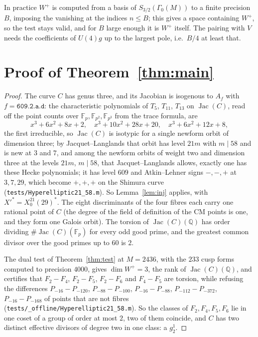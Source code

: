\documentclass[11pt,reqno]{amsart}
\theoremstyle{plain}
\theoremstyle{definition}
\DeclareMathOperator{\Jac}{Jac}
\newcommand{\Q}{\mathbb{Q}}
\newcommand{\F}{\mathbb{F}}
\begin{document}
In practice $W^+$ is computed from a basis of $S_{3/2}(\Gamma_0(M))$ to a finite precision $B$,
imposing the vanishing at the indices $n\le B$; this gives a space containing $W^+$, so the test
stays valid, and for $B$ large enough it is $W^+$ itself. The pairing with $V$ needs the
coefficients of $U(4)g$ up to the largest pole, i.e.\ $B/4$ at least that.

\section{Proof of Theorem~\ref{thm:main}}

\begin{proof}
The curve $C$ has genus three, and its Jacobian is isogenous to $A_f$ with $f=\texttt{609.2.a.d}$:
the characteristic polynomials of $T_5$, $T_{11}$, $T_{13}$ on $\Jac(C)$, read off the point counts
over $\F_p,\F_{p^2},\F_{p^3}$ from the trace formula, are
\[
x^3+6x^2+8x+2,\quad x^3+10x^2+28x+20,\quad x^3+6x^2+12x+8,
\]
the first irreducible, so $\Jac(C)$ is isotypic for a single newform orbit of dimension three; by
Jacquet--Langlands that orbit has level $21m$ with $m\mid58$ and is new at $3$ and $7$, and among the newform orbits of weight two and dimension three at the levels $21m$, $m\mid58$, that
Jacquet--Langlands allows, exactly one has these Hecke polynomials; it has level $609$ and
Atkin--Lehner signs $-,-,+$ at $3,7,29$, which become $+,+,+$ on the Shimura curve
(\texttt{tests/Hyperelliptic21\_58.m}). So Lemma~\ref{lem:inj} applies, with $X'^*=X_0^{21}(29)^*$.
The eight discriminants of the four fibres each carry one rational point of $C$ (the degree of the
field of definition of the CM points is one, and they form one Galois orbit). The torsion of
$\Jac(C)(\Q)$ has order dividing $\#\Jac(C)(\F_p)$ for every odd good prime, and the greatest common
divisor over the good primes up to $60$ is $2$.

The dual test of Theorem~\ref{thm:test} at $M=2436$, with the $233$ cusp forms computed to
precision $4000$, gives $\dim W^+=3$, the rank of $\Jac(C)(\Q)$, and certifies that
$F_2-F_4$, $F_2-F_5$, $F_2-F_6$ and $F_4-F_5$ are torsion, while refusing the differences
$P_{-16}-P_{-120}$, $P_{-88}-P_{-100}$, $P_{-16}-P_{-88}$, $P_{-112}-P_{-372}$, $P_{-16}-P_{-168}$
of points that are not fibres (\texttt{tests/\_offline/Hyperelliptic21\_58.m}). So the classes of
$F_2,F_4,F_5,F_6$ lie in one coset of a group of order at most $2$, two of them coincide, and $C$ has
two distinct effective divisors of degree two in one class: a $g^1_2$.
\end{proof}
\end{document}
